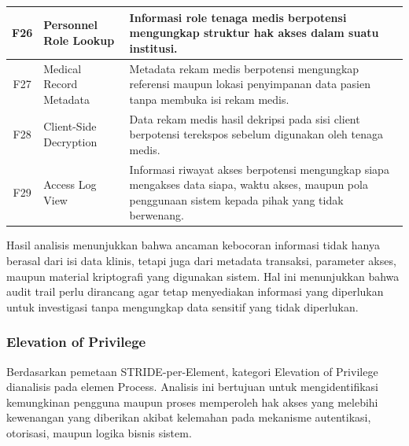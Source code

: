 \begin{xltabular}{\textwidth}{|c|>{\raggedright\arraybackslash}p{3.2cm}|X|}
    F26 &
    Personnel Role Lookup &
    Informasi role tenaga medis berpotensi mengungkap struktur hak akses dalam suatu institusi. \\
    \hline

    F27 &
    Medical Record Metadata &
    Metadata rekam medis berpotensi mengungkap referensi maupun lokasi penyimpanan data pasien tanpa membuka isi rekam medis. \\
    \hline

    F28 &
    Client-Side Decryption &
    Data rekam medis hasil dekripsi pada sisi client berpotensi terekspos sebelum digunakan oleh tenaga medis. \\
    \hline

    F29 &
    Access Log View &
    Informasi riwayat akses berpotensi mengungkap siapa mengakses data siapa, waktu akses, maupun pola penggunaan sistem kepada pihak yang tidak berwenang. \\
    \hline

\end{xltabular}

Hasil analisis menunjukkan bahwa ancaman kebocoran informasi tidak hanya berasal dari isi data klinis, tetapi juga dari metadata transaksi, parameter akses, maupun material kriptografi yang digunakan sistem. Hal ini menunjukkan bahwa audit trail perlu dirancang agar tetap menyediakan informasi yang diperlukan untuk investigasi tanpa mengungkap data sensitif yang tidak diperlukan.

\subsubsection{Elevation of Privilege}

Berdasarkan pemetaan STRIDE-per-Element, kategori Elevation of Privilege dianalisis pada elemen Process. Analisis ini bertujuan untuk mengidentifikasi kemungkinan pengguna maupun proses memperoleh hak akses yang melebihi kewenangan yang diberikan akibat kelemahan pada mekanisme autentikasi, otorisasi, maupun logika bisnis sistem.

